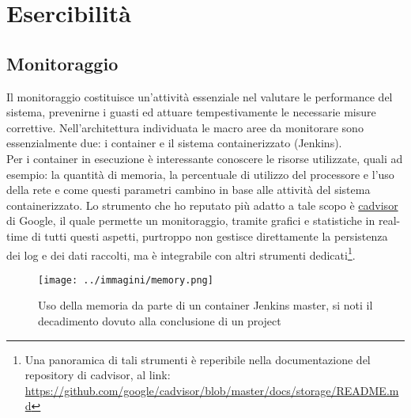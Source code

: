 
\pagestyle{IHA-fancy-style}
\chapter{Esercibilità}
\label{cap:esercibilità}


\section{Monitoraggio}
\label{sec:monitoring}

Il monitoraggio\cite[Chapter~1]{book:jenkins-cookbook} costituisce un'attività essenziale nel valutare le performance del sistema, prevenirne i guasti ed attuare tempestivamente le necessarie misure correttive. Nell'architettura individuata le macro aree da monitorare sono essenzialmente due: i \gls{container} e il sistema containerizzato (Jenkins). \\
Per i \gls{container} in esecuzione è interessante conoscere le risorse utilizzate, quali ad esempio: la quantità di memoria, la percentuale di utilizzo del processore e l'uso della rete e come questi parametri cambino in base alle attività del sistema containerizzato. Lo strumento che ho reputato più adatto a tale scopo è \hyperref[subsec:cadvisor]{cadvisor} di Google, il quale permette un monitoraggio, tramite grafici e statistiche in real-time di tutti questi aspetti, purtroppo non gestisce direttamente la persistenza dei log e dei dati raccolti, ma è integrabile con altri strumenti dedicati\footnote{Una panoramica di tali strumenti è reperibile nella documentazione del repository di cadvisor, al link: \url{https://github.com/google/cadvisor/blob/master/docs/storage/README.md}}. 

\begin{figure}[H]
    \capstart
    \centering
    \captionsetup{justification=centering}
    \texttt{[image: ../immagini/memory.png]}
    \caption[Uso della memoria da parte di un container Jenkins \gls{master}]{Uso della memoria da parte di un container Jenkins \gls{master}, si noti il decadimento dovuto alla conclusione di un \gls{project}}
\end{figure}
 
